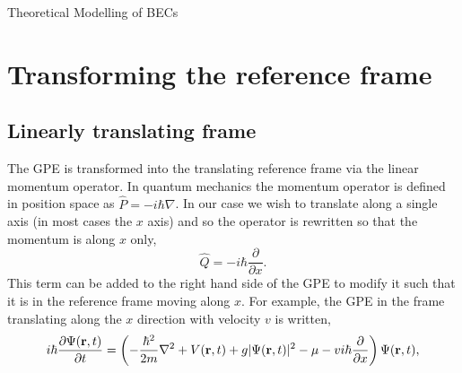 \begin{chapter}{\label{cha:theoretical_model}Theoretical Modelling of BECs}
\section{\label{section:movframe} Transforming the reference frame}
	\subsection{\label{section:linearmovframe} Linearly translating frame}

	The GPE is transformed into the translating reference frame via the linear momentum operator. In quantum mechanics the momentum operator is defined in position space as $\hat{P} = -i\hbar\nabla$. In our case we wish to translate along a single axis (in most cases the $x$ axis) and so the operator is rewritten so that the momentum is along $x$ only,
	\begin{equation*}
	\hat{Q} = -i\hbar\frac{\partial}{\partial x}.
	\end{equation*}
	This term can be added to the right hand side of the GPE to modify it such that it is in the reference frame moving along $x$. For example, the GPE in the frame translating along the $x$ direction with velocity $v$ is written,
	\begin{equation}\label{eq:linearframegpe}
	i\hbar \frac{\partial\Psi({\bf r},t)}{\partial t} = \left(-\frac{\hbar^2}{2m}\nabla^2 + V({\bf r},t) + g|\Psi({\bf r},t)|^2 - \mu -vi\hbar\frac{\partial}{\partial x} \right ) \Psi({\bf r},t),
	\end{equation}



\end{chapter}
